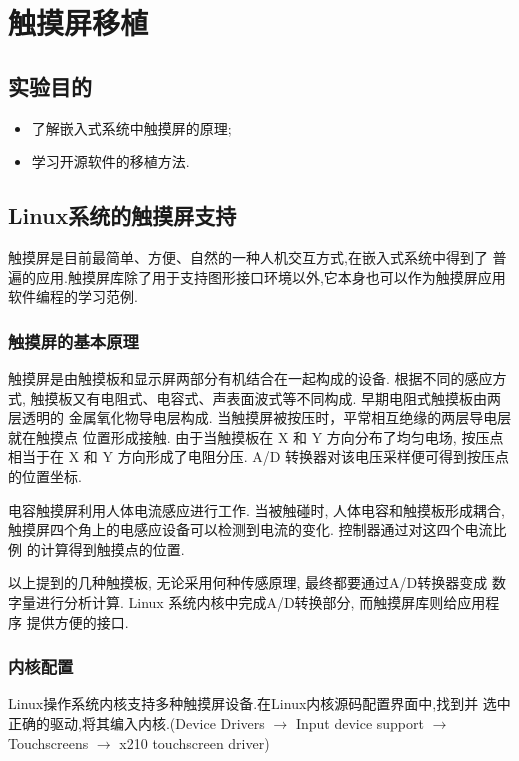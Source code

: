 \chapter{触摸屏移植}\label{ch-ts}

\section{实验目的}
\begin{itemize}\itemsep=-3pt
  \item 了解嵌入式系统中触摸屏的原理;
  \item 学习开源软件的移植方法.
\end{itemize}

\section{Linux系统的触摸屏支持}
	触摸屏是目前最简单、方便、自然的一种人机交互方式,在嵌入式系统中得到了
普遍的应用.触摸屏库除了用于支持图形接口环境以外,它本身也可以作为触摸屏应用
软件编程的学习范例.

\subsection{触摸屏的基本原理}
    触摸屏是由触摸板和显示屏两部分有机结合在一起构成的设备. 根据不同的感应方式,
触摸板又有电阻式、电容式、声表面波式等不同构成. 早期电阻式触摸板由两层透明的
金属氧化物导电层构成. 当触摸屏被按压时，平常相互绝缘的两层导电层就在触摸点
位置形成接触. 由于当触摸板在 X 和 Y 方向分布了均匀电场, 按压点相当于在 X 和
Y 方向形成了电阻分压. A/D 转换器对该电压采样便可得到按压点的位置坐标.

    电容触摸屏利用人体电流感应进行工作. 当被触碰时, 人体电容和触摸板形成耦合,
触摸屏四个角上的电感应设备可以检测到电流的变化. 控制器通过对这四个电流比例
的计算得到触摸点的位置.

    以上提到的几种触摸板, 无论采用何种传感原理, 最终都要通过A/D转换器变成
数字量进行分析计算. Linux 系统内核中完成A/D转换部分, 而触摸屏库则给应用程序
提供方便的接口.

\subsection{内核配置}
	Linux操作系统内核支持多种触摸屏设备.在Linux内核源码配置界面中,找到并
选中正确的驱动,将其编入内核.(Device Drivers $\to$ Input device support
$\to$ Touchscreens $\to$ x210 touchscreen driver)

